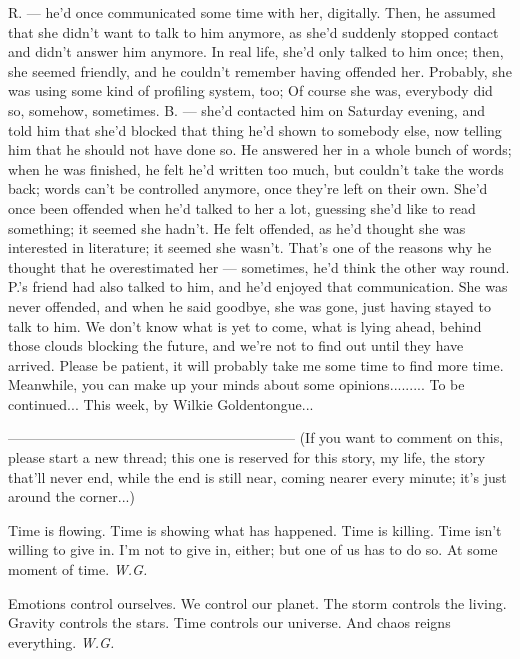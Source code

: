 R. --- he'd once communicated some time with her, digitally. Then, he assumed that she didn't want to talk to him anymore, as she'd suddenly stopped contact and didn't answer him anymore. In real life, she'd only talked to him once; then, she seemed friendly, and he couldn't remember having offended her. Probably, she was using some kind of profiling system, too; Of course she was, everybody did so, somehow, sometimes. 
B. --- she'd contacted him on Saturday evening, and told him that she'd blocked that thing he'd shown to somebody else, now telling him that he should not have done so. He answered her in a whole bunch of words; when he was finished, he felt he'd written too much, but couldn't take the words back; words can't be controlled anymore, once they're left on their own. She'd once been offended when he'd talked to her a lot, guessing she'd like to read something; it seemed she hadn't. He felt offended, as he'd thought she was interested in literature; it seemed she wasn't. 
That's one of the reasons why he thought that he overestimated her --- sometimes, he'd think the other way round. 
P.'s friend had also talked to him, and he'd enjoyed that communication. She was never offended, and when he said goodbye, she was gone, just having stayed to talk to him. 
We don't know what is yet to come, what is lying ahead, behind those clouds blocking the future, and we're not to find out until they have arrived. 
Please be patient, it will probably take me some time to find more time. 
Meanwhile, you can make up your minds about some opinions.........
To be continued...
This week, by Wilkie Goldentongue...

--------------------------------------------------------------
(If you want to comment on this, please start a new thread; this one is reserved for this story, my life, the story that'll never end, while the end is still near, coming nearer every minute; it's just around the corner...)

Time is flowing. 
Time is showing 
what has happened. 
Time is killing. 
Time isn't willing 
to give in. 
I'm not to give in, either; 
but one of us has to do so. 
At some moment 
of time. 
\emph{W.G.}

Emotions 
control ourselves. 
We 
control our planet. 
The storm 
controls the living. 
Gravity 
controls the stars. 
Time 
controls our universe. 
And chaos 
reigns everything. 
\emph{W.G.}
